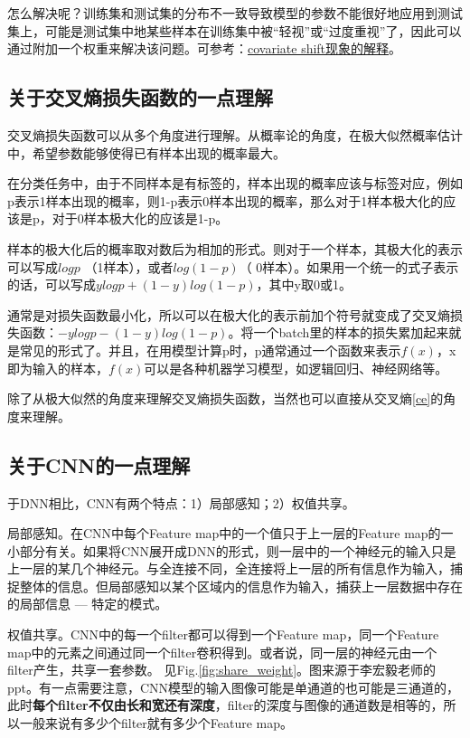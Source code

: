 怎么解决呢？训练集和测试集的分布不一致导致模型的参数不能很好地应用到测试集上，可能是测试集中地某些样本在训练集中被“轻视”或“过度重视”了，因此可以通过附加一个权重来解决该问题。可参考：\href{https://blog.csdn.net/mao_xiao_feng/article/details/54317852}{covariate shift现象的解释}。

\subsection{关于交叉熵损失函数的一点理解}
交叉熵损失函数可以从多个角度进行理解。从概率论的角度，在极大似然概率估计中，希望参数能够使得已有样本出现的概率最大。

在分类任务中，由于不同样本是有标签的，样本出现的概率应该与标签对应，例如p表示1样本出现的概率，则1-p表示0样本出现的概率，那么对于1样本极大化的应该是p，对于0样本极大化的应该是1-p。

样本的极大化后的概率取对数后为相加的形式。则对于一个样本，其极大化的表示可以写成$log p$ （1样本），或者$log(1-p)$（ 0样本）。如果用一个统一的式子表示的话，可以写成$y log p + (1-y) log(1-p)$，其中y取0或1。

通常是对损失函数最小化，所以可以在极大化的表示前加个符号就变成了交叉熵损失函数：$- y log p - (1-y) log(1-p)$。将一个batch里的样本的损失累加起来就是常见的形式了。并且，在用模型计算p时，p通常通过一个函数来表示$f(x)$，x即为输入的样本，$f(x)$可以是各种机器学习模型，如逻辑回归、神经网络等。

除了从极大似然的角度来理解交叉熵损失函数，当然也可以直接从交叉熵\ref{ce}的角度来理解。

\subsection{关于CNN的一点理解}
于DNN相比，CNN有两个特点：1）局部感知；2）权值共享。

局部感知。在CNN中每个Feature map中的一个值只于上一层的Feature map的一小部分有关。如果将CNN展开成DNN的形式，则一层中的一个神经元的输入只是上一层的某几个神经元。与全连接不同，全连接将上一层的所有信息作为输入，捕捉整体的信息。但局部感知以某个区域内的信息作为输入，捕获上一层数据中存在的局部信息 --- 特定的模式。

权值共享。CNN中的每一个filter都可以得到一个Feature map，同一个Feature map中的元素之间通过同一个filter卷积得到。或者说，同一层的神经元由一个filter产生，共享一套参数。
见Fig.\ref{fig:share_weight}。图来源于李宏毅老师的ppt。有一点需要注意，CNN模型的输入图像可能是单通道的也可能是三通道的，此时\textbf{每个filter不仅由长和宽还有深度}，filter的深度与图像的通道数是相等的，所以一般来说有多少个filter就有多少个Feature map。

